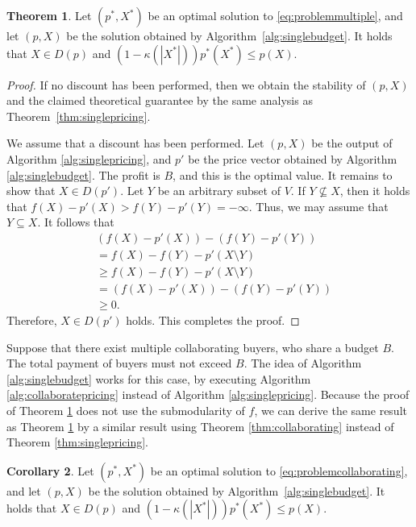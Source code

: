 \documentclass[letterpaper]{article}
\theoremstyle{definition}
\newtheorem{theorem}{Theorem}
\newtheorem{corollary}[theorem]{Corollary}
\begin{document}
\begin{theorem}
\label{thm:singlebudget}
Let $(p^*, X^*)$ be an optimal solution to \eqref{eq:problemmultiple},
and let $(p, X)$ be the solution obtained by Algorithm~\ref{alg:singlebudget}.
It holds that $X\in D(p)$ and \((1-\kappa(|X^*|))p^*(X^*)\le p(X)\).
\end{theorem}
\begin{proof}%
If no discount has been performed, then we obtain the stability of $(p, X)$ and the claimed theoretical guarantee by the same analysis as Theorem~\ref{thm:singlepricing}. 

We assume that a discount has been performed. 
Let $(p, X)$ be the output of Algorithm \ref{alg:singlepricing}, and $p'$ be the price vector obtained by Algorithm \ref{alg:singlebudget}. 
The profit is $B$, and this is the optimal value. 
It remains to show that $X \in D(p')$. 
Let $Y$ be an arbitrary subset of $V$. 
If $Y \not\subseteq X$, then it holds that $f(X) - p'(X) > f(Y)-p'(Y) = - \infty$. 
Thus, we may assume that $Y \subseteq X$. 
It follows that
\begin{align*}
&(f(X) - p'(X)) - (f(Y) - p'(Y)) \\
&= f(X)-f(Y)-p'(X \setminus Y) \\
&\geq f(X)-f(Y)-p'(X \setminus Y)\\
&= (f(X) - p'(X)) - (f(Y) - p'(Y))\\
&\geq 0.
\end{align*}
Therefore, $X \in D(p')$ holds. 
This completes the proof.
\end{proof}

Suppose that there exist multiple collaborating buyers, who share a budget $B$. 
The total payment of buyers must not exceed $B$. 
The idea of Algorithm \ref{alg:singlebudget} works for this case, by executing Algorithm \ref{alg:collaboratepricing} instead of Algorithm \ref{alg:singlepricing}. 
Because the proof of Theorem \ref{thm:singlebudget} does not use the submodularity of $f$, we can derive the same result as Theorem \ref{thm:singlebudget} by a similar result using Theorem \ref{thm:collaborating} instead of Theorem \ref{thm:singlepricing}. 
\begin{corollary}
Let $(p^*, X^*)$ be an optimal solution to \eqref{eq:problemcollaborating},
and let $(p, X)$ be the solution obtained by Algorithm~\ref{alg:singlebudget}.
It holds that $X\in D(p)$ and \((1-\kappa(|X^*|))p^*(X^*)\le p(X)\).
\end{corollary}
\end{document}
